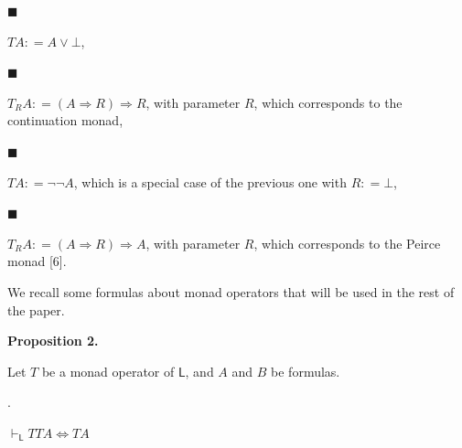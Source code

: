\par\noindent  $\blacksquare$ 
 
$TA\mathrel{\mathop{:}}=A\mathbin{\vee}\bot$,\par
 
 
 
\par\noindent  $\blacksquare$ 
 
$T_{R}A\mathrel{\mathop{:}}=(A\mathbin{\Rightarrow}R)\mathbin{\Rightarrow}R$, with parameter $R$, which corresponds to the continuation monad,\par
 
 
 
\par\noindent  $\blacksquare$ 
 
$TA\mathrel{\mathop{:}}=\neg\neg A$, which is a special case of the previous one with $R\mathrel{\mathop{:}}=\bot$,\par
 
 
 
\par\noindent  $\blacksquare$ 
 
$T_{R}A\mathrel{\mathop{:}}=(A\mathbin{\Rightarrow}R)\mathbin{\Rightarrow}A$, with parameter $R$, which corresponds to the Peirce monad [6].\par
 
 
  
 
 
 
We recall some formulas about monad operators that will be used in the rest of the paper.\par
 
 
 
\par\medskip\noindent\textbf{Proposition 2.}\par
 
 
Let $T$ be a monad operator of $\mathsf{L}$, and $A$ and $B$ be formulas.\par
  
\par{}. 
 
$\vdash_{\mathsf{L}}TTA\Leftrightarrow TA$\par
 
